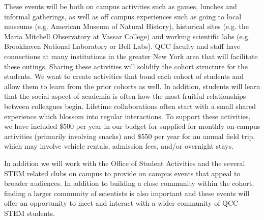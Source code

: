 \documentclass[12pt]{article}
\begin{document}
These events will be both on campus activities such as games, lunches and informal gatherings, as well as off campus experiences such as going to local museums (e.g. American Museum of Natural History), historical sites (e.g. the Maria Mitchell Observatory at Vassar College) and working scientific labs (e.g. Brookhaven National Laboratory or Bell Labs). QCC faculty and staff have connections at many institutions in the greater New York area that will facilitate these outings.  Sharing these activities will solidify the cohort structure for the students.  We want to create activities that bond each cohort of students and allow them to learn from the prior cohorts as well.  In addition, students will learn that the social aspect of academia is often how the most fruitful relationships between colleagues begin.  Lifetime collaborations often start with a small shared experience which blossom into regular interactions.  To support these activities, we have included \$500 per year in our budget for supplied for monthly on-campus activities (primarily involving snacks) and \$550 per year  for an annual field trip, which may involve vehicle rentals, admission fees, and/or overnight stays.

In addition we will work with the Office of Student Activities and the several STEM related clubs on campus to provide on campus events that appeal to broader audiences.  In addition to building a close community within the cohort, finding a larger community of scientists is also important and these events will offer an opportunity to meet and interact with a wider community of QCC STEM students. 



\end{document}

